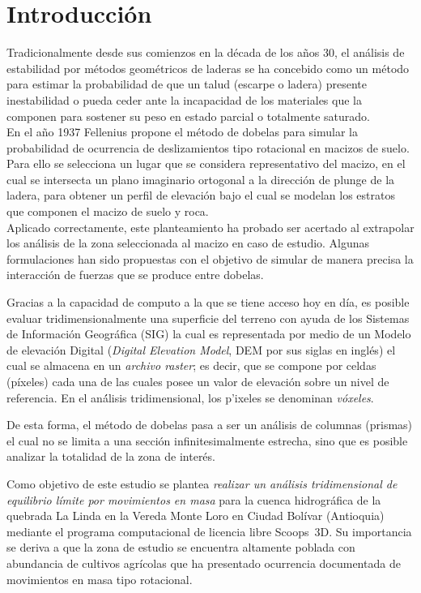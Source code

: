 \chapter{Introducci\'{o}n}
Tradicionalmente desde sus comienzos en la d\'ecada de los a\~{n}os 30, el an\'alisis de estabilidad por métodos geom\'etricos de laderas se ha concebido como un m\'etodo para estimar la probabilidad de que un talud (escarpe o ladera) presente inestabilidad o pueda ceder ante la incapacidad de los materiales que la componen para sostener su peso en estado parcial o totalmente saturado.\\


En el a\~{n}o 1937 Fellenius propone el m\'etodo de dobelas para simular la probabilidad de ocurrencia de deslizamientos tipo rotacional en macizos de suelo. Para ello se selecciona un lugar que se considera representativo del macizo, en el cual se intersecta un plano imaginario ortogonal a la direcci\'on de plunge de la ladera, para obtener un perfil de elevaci\'on bajo el cual se modelan los estratos que componen el macizo de suelo y roca.\\

Aplicado correctamente, este planteamiento ha probado ser acertado al extrapolar los an\'alisis de la zona seleccionada al macizo en caso de estudio. Algunas formulaciones han sido propuestas con el objetivo de simular de manera precisa la interacci\'on de fuerzas que se produce entre dobelas.

Gracias a la capacidad de computo a la que se tiene acceso hoy en d\'ia, es posible evaluar tridimensionalmente una superficie del terreno con ayuda de los Sistemas de Informaci\'on Geogr\'afica (SIG) la cual es representada por medio de un Modelo de elevaci\'on Digital (\textit{Digital Elevation Model}, DEM por sus siglas en ingl\'es) el cual se almacena en un \emph{archivo raster}; es decir, que se compone por celdas (p\'ixeles) cada una de las cuales posee un valor de elevaci\'on sobre un nivel de referencia. En el an\'álisis tridimensional, los p'ixeles se denominan \emph{v\'oxeles}.

De esta forma, el m\'etodo de dobelas pasa a ser un an\'alisis de columnas (prismas) el cual no se limita a una secci\'on infinitesimalmente estrecha, sino que es posible analizar la totalidad de la zona de inter\'es.

Como objetivo de este estudio se plantea \emph{realizar un an\'alisis tridimensional de equilibrio l\'imite por movimientos en masa} para la cuenca hidrogr\'afica de la quebrada La Linda en la Vereda Monte Loro en Ciudad Bol\'ivar (Antioquia) mediante el programa computacional de licencia libre Scoops~3D.
Su importancia se deriva a que la zona de estudio se encuentra altamente poblada \cite{sgc2013} con abundancia de cultivos agr\'icolas que ha presentado ocurrencia documentada de movimientos en masa tipo rotacional.\\

